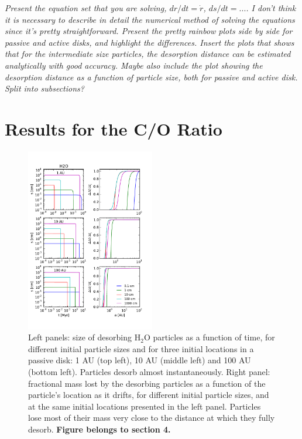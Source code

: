 \documentclass[apj]{emulateapj}
\newcommand{\emgr}[1]{\emph{ \color{gray} #1}}
\begin{document}
\emgr{Present the equation set that you are solving, $dr/dt=\dot{r}$, $ds/dt=...$. I don't think it is necessary to describe in detail the numerical method of solving the equations since it's pretty straightforward. Present the pretty rainbow plots side by side for passive and active disks, and highlight the differences. Insert the plots that shows that for the intermediate size particles, the desorption distance can be estimated analytically with good accuracy. Maybe also include the plot showing the desorption distance as a function of particle size, both for passive and active disk. Split into subsections?}


\section{Results for the C/O Ratio}

\begin{figure}[h!]
\centering
\includegraphics[width=0.5\textwidth]{../../figs/s_t_a.pdf}
\caption{Left panels: size of desorbing H$_2$O particles as a function of time, for different initial particle sizes and for three initial locations in a passive disk: 1 AU (top left), 10 AU (middle left) and 100 AU (bottom left). Particles desorb almost instantaneously. Right panel: fractional mass lost by the desorbing particles as a function of the particle's location as it drifts, for different initial particle sizes, and at the same initial locations presented in the left panel. Particles lose most of their mass very close to the distance at which they fully desorb. \textbf{Figure belongs to section 4.}}
\label{fig:s_t_a}
\end{figure}
\end{document}
